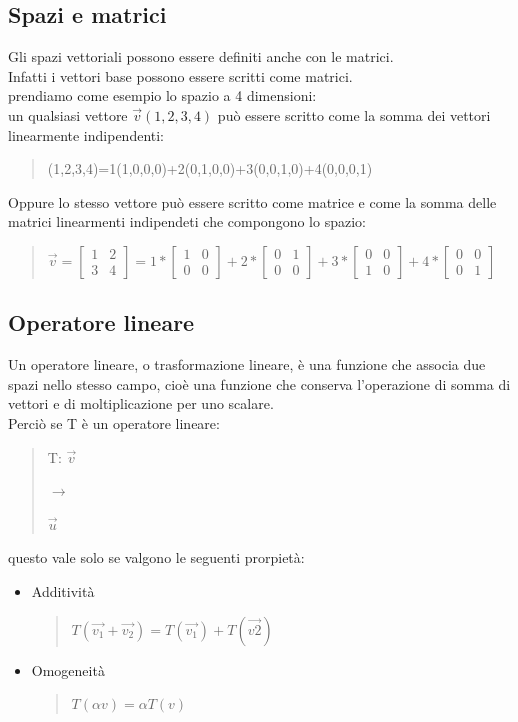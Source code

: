 \documentclass[a4paper]{article}
\begin{document}
\subsection{Spazi e matrici}
Gli spazi vettoriali possono essere definiti anche con le matrici.
\\ Infatti i vettori base possono essere scritti come matrici.
\\ prendiamo come esempio lo spazio a 4 dimensioni:
\\ un qualsiasi vettore $\vec{v}(1,2,3,4)$ può essere scritto come la somma dei vettori linearmente indipendenti:
\begin{quote} \centering (1,2,3,4)=1(1,0,0,0)+2(0,1,0,0)+3(0,0,1,0)+4(0,0,0,1)
\end{quote}
Oppure lo stesso vettore può essere scritto come matrice e come la somma delle matrici linearmenti indipendeti che compongono lo spazio:
\\
\begin{quote} \centering $\vec{v}
=\left[\begin{matrix}1& 2\\ 3 & 4\end{matrix}\right]
= 1*\left[\begin{matrix}1& 0 \\ 0 & 0\end{matrix}\right]
+ 2*\left[\begin{matrix}0 & 1 \\ 0 & 0\end{matrix}\right]
+ 3*\left[\begin{matrix}0 & 0 \\ 1 & 0\end{matrix}\right]
+ 4*\left[\begin{matrix}0 & 0 \\ 0 & 1\end{matrix}\right]
$\end{quote}
 	
\subsection{Operatore lineare}
Un operatore lineare, o trasformazione lineare, è una funzione che associa due spazi nello stesso campo, cioè una funzione che conserva l'operazione di somma di vettori e di moltiplicazione per uno scalare.
\\ Perciò se T è un operatore lineare:
\begin{quote} \centering T: $\vec{v} 
$
\begin{large} $\rightarrow$ \end{large} 
$ \vec{u}
$\end{quote}
questo vale solo se valgono le seguenti prorpietà:
\begin{itemize}
\item Additività
\begin{quote} \centering $T(\vec{v_{1}} + \vec{v_{2}})= T(\vec{v_{1}})+T(\vec{v{2}}) 
$\end{quote}
\item Omogeneità
\begin{quote} \centering $T(\alpha v)=\alpha T(v) $
\end{quote}
\end{itemize}
\end{document}
